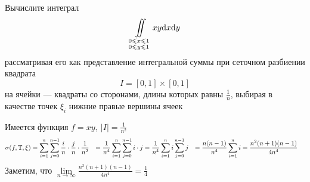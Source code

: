 Вычислите интеграл
$$\iint\limits_{\substack{0\leqslant x\leqslant 1\\ 0\leqslant y\leqslant 1}}xy\text{d}x\text{d}y$$
рассматривая его как представление интегральной суммы при сеточном разбиении квадрата $$I = [0, 1]\times[0, 1]$$ на ячейки — квадраты со сторонами, длины которых равны $\frac{1}{n}$, выбирая в качестве точек $\xi_i$ нижние правые вершины ячеек

\begin{minipage}{0.5\textwidth}
Имеется функция $f = xy,\ |I| =\displaystyle\frac{1}{n^2}$
\begin{equation*}
    \begin{aligned}
        \sigma(f, \T, \xi) &= \sum_{i=1}^n \sum_{j=0}^{n-1}\frac{i}{n}\cdot\frac{j}{n}\cdot\frac{1}{n^2}
        &= \frac{1}{n^4}\sum_{i=1}^n\sum_{j=0}^{n-1} i\cdot j
        &= \frac{1}{n^4}\sum_{i=1}^n i \sum_{j=0}^{n-1} j
        &= \frac{n (n-1) }{n^4} \sum_{i=1}^ni
        &= \frac{n^2 (n+1) (n-1)}{4n^4}
    \end{aligned}
\end{equation*}
Заметим, что $\lim\limits_{n\rightarrow\infty}\displaystyle \frac{n^2 (n+1) (n-1)}{4n^4}=\frac{1}{4}$
\end{minipage}

\begin{center}
    
\end{center}
